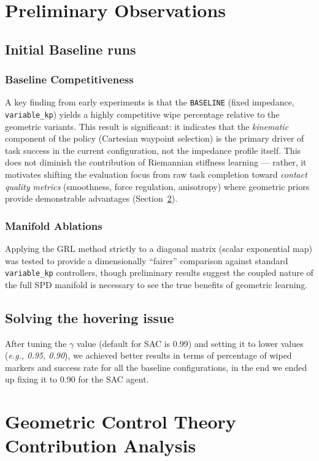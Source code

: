 \documentclass[letterpaper, 10 pt, conference]{IEEEtran}
\begin{document}
\section{Preliminary Observations}
\subsection{Initial Baseline runs}
\subsubsection{Baseline Competitiveness}
A key finding from early experiments is that the \texttt{BASELINE} (fixed impedance, \texttt{variable\_kp}) yields a highly competitive wipe percentage relative to the geometric variants.
This result is significant: it indicates that the \textit{kinematic} component of the policy (Cartesian waypoint selection) is the primary driver of task success in the current configuration, not the impedance profile itself.
This does not diminish the contribution of Riemannian stiffness learning — rather, it motivates shifting the evaluation focus from raw task completion toward \textit{contact quality metrics} (smoothness, force regulation, anisotropy) where geometric priors provide demonstrable advantages (Section~\ref{sec:geometric_analysis}).
\subsubsection{Manifold Ablations} Applying the GRL method strictly to a diagonal matrix (scalar exponential map) was tested to provide a dimensionally ``fairer'' comparison against standard \texttt{variable\_kp} controllers, though preliminary results suggest the coupled nature of the full SPD manifold is necessary to see the true benefits of geometric learning.

\subsection{Solving the hovering issue}
After tuning the $\gamma$ value (default for SAC is 0.99) and setting it to lower values (\textit{e.g., 0.95, 0.90}), we achieved better results in terms of percentage of wiped markers and success rate for all the baseline configurations, in the end we ended up fixing it to 0.90 for the SAC agent.


\section{Geometric Control Theory Contribution Analysis}
\label{sec:geometric_analysis}
\end{document}
